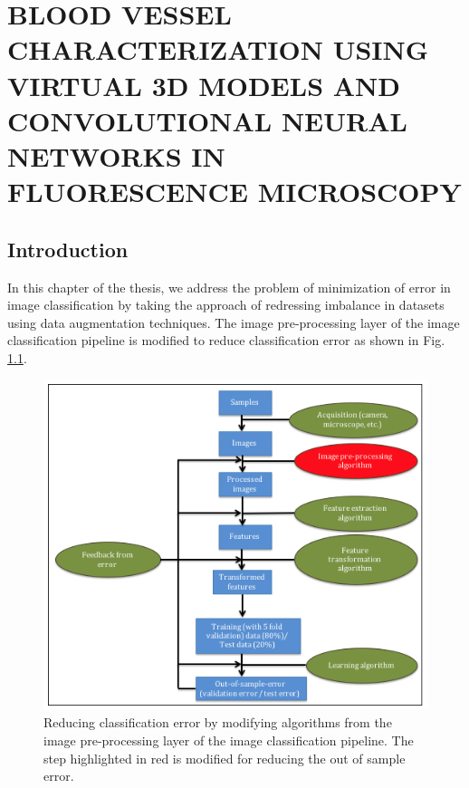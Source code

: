 \chapter{BLOOD VESSEL CHARACTERIZATION USING VIRTUAL 3D MODELS AND CONVOLUTIONAL NEURAL NETWORKS IN FLUORESCENCE MICROSCOPY}
\label{chap:ISBI}

\let\thefootnote\relax{}

\section{Introduction}

In this chapter of the thesis, we address the problem of minimization of error in image classification by taking the approach of redressing imbalance in datasets using data augmentation techniques. The image pre-processing layer of the image classification pipeline is modified to reduce classification error as shown in Fig. \ref{fig:chapter2}.

\begin{figure}[ht!]
\centering
\includegraphics[width=1.0\textwidth]{img/chapter2}
\caption{Reducing classification error by modifying algorithms from the image pre-processing layer of the image classification pipeline. The step highlighted in red is modified for reducing the out of sample error.}
\label{fig:chapter2}
\end{figure}

